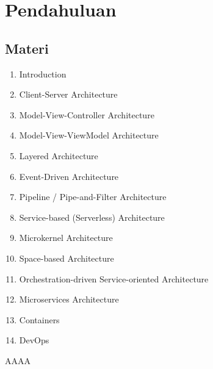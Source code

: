 \chapter{Pendahuluan}

\section{Materi}
\begin{enumerate}
\item Introduction
\item Client-Server Architecture
\item Model-View-Controller Architecture
\item Model-View-ViewModel Architecture
\item Layered Architecture
\item Event-Driven Architecture
\item Pipeline / Pipe-and-Filter Architecture
\item Service-based (Serverless) Architecture
\item Microkernel Architecture
\item Space-based Architecture
\item Orchestration-driven Service-oriented Architecture
\item Microservices Architecture
\item Containers
\item DevOps
\end{enumerate}

AAAA \cite{cormen2009introduction}


